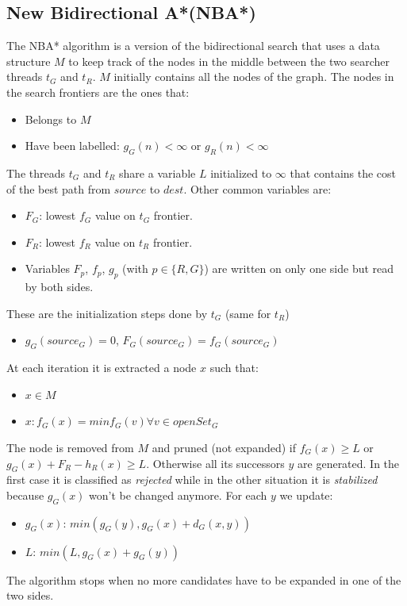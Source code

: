 \documentclass[twocolumn, switch]{article} %
\begin{document}
\subsection{New Bidirectional A*(NBA*)}
The NBA* algorithm is a version of  the bidirectional search that uses a data
structure $M$ to keep track of the nodes in the middle between the two searcher
threads $t_G$ and $t_R$. $M$ initially contains all the nodes of the graph. The nodes
in the search frontiers are the ones that:
\begin{itemize}
  \item Belongs to $M$
  \item Have been labelled: $g_G(n) < \infty $ or $g_R(n) < \infty $
\end{itemize}
The threads $t_G$ and $t_R$ share a variable $L$ initialized to $\infty$ that contains
the cost of the best path from $source$ to $dest$. Other common variables are:
\begin{itemize}
  \item $F_G$: lowest $f_G$ value on $t_G$ frontier.
  \item $F_R$: lowest $f_R$ value on $t_R$ frontier.
  \item Variables $F_p$, $f_p$, $g_p$ (with $p \in \{R,G\}$) are written on only one
        side but read by both sides.
\end{itemize}
These are the initialization steps done by $t_G$ (same for $t_R$)
\begin{itemize}
  \item $g_G(source_G)=0$, $F_G(source_G)=f_G(source_G)$
\end{itemize}
At each iteration it is extracted a node $x$ such that:
\begin{itemize}
  \item $x \in M$
  \item $x: f_G(x) = min f_G(v) \forall v \in openSet_G$ 
\end{itemize}
The node is removed from $M$ and pruned (not expanded) if $f_G(x) \ge L$ or
$g_G(x)+F_R-h_R(x) \ge L$. Otherwise all its successors $y$ are generated. In the
first case it is classified as \textit{rejected} while in the other situation it is
\textit{stabilized} because $g_G(x)$ won't be changed anymore. For each $y$ we update:
\begin{itemize}
  \item $g_G(x)$: $min(g_G(y), g_G(x) + d_G(x, y))$
  \item $L$: $min(L, g_G(x) + g_G(y))$
\end{itemize}
The algorithm stops when no more candidates have to be expanded in one of the two sides.
\end{document}
